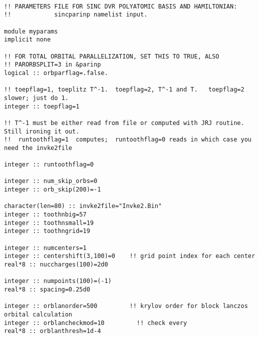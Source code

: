 \begin{verbatim}

!! PARAMETERS FILE FOR SINC DVR POLYATOMIC BASIS AND HAMILTONIAN:
!!            sincparinp namelist input.

module myparams
implicit none

!! FOR TOTAL ORBITAL PARALLELIZATION, SET THIS TO TRUE, ALSO
!! PARORBSPLIT=3 in &parinp
logical :: orbparflag=.false.

!! toepflag=1, toeplitz T^-1.  toepflag=2, T^-1 and T.   toepflag=2 slower; just do 1.
integer :: toepflag=1

!! T^-1 must be either read from file or computed with JRJ routine.  Still ironing it out.
!!  runtoothflag=1  computes;  runtoothflag=0 reads in which case you need the invke2file

integer :: runtoothflag=0

integer :: num_skip_orbs=0
integer :: orb_skip(200)=-1

character(len=80) :: invke2file="Invke2.Bin"
integer :: toothnbig=57
integer :: toothnsmall=19
integer :: toothngrid=19

integer :: numcenters=1
integer :: centershift(3,100)=0    !! grid point index for each center
real*8 :: nuccharges(100)=2d0

integer :: numpoints(100)=(-1)
real*8 :: spacing=0.25d0

integer :: orblanorder=500         !! krylov order for block lanczos orbital calculation
integer :: orblancheckmod=10         !! check every
real*8 :: orblanthresh=1d-4

\end{verbatim}
